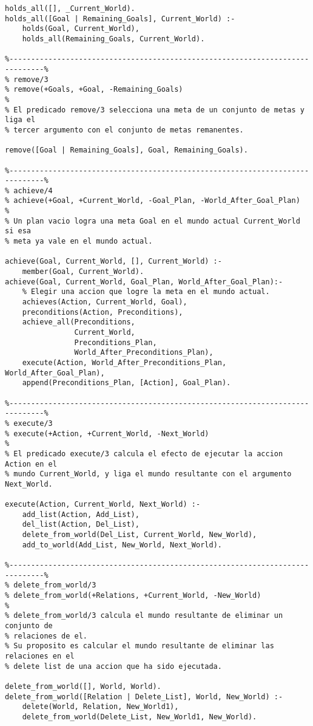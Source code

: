 \documentclass[a4paper,12pt]{report}
\begin{document}
\begin{footnotesize}
\begin{verbatim}
holds_all([], _Current_World).
holds_all([Goal | Remaining_Goals], Current_World) :-
    holds(Goal, Current_World), 
    holds_all(Remaining_Goals, Current_World).

%------------------------------------------------------------------------------%
% remove/3
% remove(+Goals, +Goal, -Remaining_Goals)
%
% El predicado remove/3 selecciona una meta de un conjunto de metas y liga el 
% tercer argumento con el conjunto de metas remanentes.

remove([Goal | Remaining_Goals], Goal, Remaining_Goals).

%------------------------------------------------------------------------------%
% achieve/4
% achieve(+Goal, +Current_World, -Goal_Plan, -World_After_Goal_Plan)
% 
% Un plan vacio logra una meta Goal en el mundo actual Current_World si esa 
% meta ya vale en el mundo actual. 

achieve(Goal, Current_World, [], Current_World) :- 
    member(Goal, Current_World).
achieve(Goal, Current_World, Goal_Plan, World_After_Goal_Plan):-
    % Elegir una accion que logre la meta en el mundo actual.
    achieves(Action, Current_World, Goal),
    preconditions(Action, Preconditions),
    achieve_all(Preconditions, 
                Current_World, 
                Preconditions_Plan, 
                World_After_Preconditions_Plan),
    execute(Action, World_After_Preconditions_Plan, World_After_Goal_Plan),
    append(Preconditions_Plan, [Action], Goal_Plan).

%------------------------------------------------------------------------------%
% execute/3
% execute(+Action, +Current_World, -Next_World)
%
% El predicado execute/3 calcula el efecto de ejecutar la accion Action en el 
% mundo Current_World, y liga el mundo resultante con el argumento Next_World.

execute(Action, Current_World, Next_World) :-
    add_list(Action, Add_List),
    del_list(Action, Del_List),
    delete_from_world(Del_List, Current_World, New_World),
    add_to_world(Add_List, New_World, Next_World).

%------------------------------------------------------------------------------%
% delete_from_world/3
% delete_from_world(+Relations, +Current_World, -New_World)
% 
% delete_from_world/3 calcula el mundo resultante de eliminar un conjunto de 
% relaciones de el. 
% Su proposito es calcular el mundo resultante de eliminar las relaciones en el 
% delete list de una accion que ha sido ejecutada.

delete_from_world([], World, World).
delete_from_world([Relation | Delete_List], World, New_World) :-
    delete(World, Relation, New_World1),
    delete_from_world(Delete_List, New_World1, New_World).


\end{verbatim}
\end{footnotesize}
\end{document}
